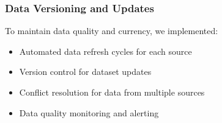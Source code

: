 \subsubsection{Data Versioning and Updates}
To maintain data quality and currency, we implemented:
\begin{itemize}
    \item Automated data refresh cycles for each source
    \item Version control for dataset updates
    \item Conflict resolution for data from multiple sources
    \item Data quality monitoring and alerting
\end{itemize}

